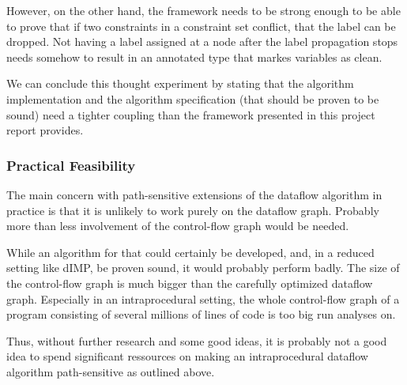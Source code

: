 However, on the other hand, the framework needs to be strong enough to be able to prove that if
two constraints in a constraint set conflict, that the label can be dropped.
Not having a label assigned at a node after the label propagation stops needs somehow to 
result in an annotated type that markes variables as clean.

We can conclude this thought experiment by stating that the algorithm implementation and
the algorithm specification (that should be proven to be sound) need a tighter coupling
than the framework presented in this project report provides.

\subsubsection*{Practical Feasibility}
The main concern with path-sensitive extensions of the dataflow algorithm in practice is
that it is unlikely to work purely on the dataflow graph.
Probably more than less involvement of the control-flow graph would be needed.

While an algorithm for that could certainly be developed, and, in a reduced setting like
dIMP, be proven sound, it would probably perform badly.
The size of the control-flow graph is much bigger than the carefully optimized dataflow graph.
Especially in an intraprocedural setting, the whole control-flow graph of a program
consisting of several millions of lines of code is too big run analyses on.

Thus, without further research and some good ideas, it is probably not a good idea
to spend significant ressources on making an intraprocedural dataflow algorithm path-sensitive
as outlined above.
\fi
